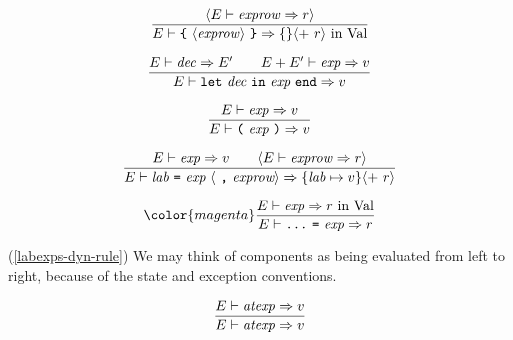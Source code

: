 \begin{equation}	%
\frac{\langle\E\ts\labexps\ra\r\rangle}
     {\E\ts\lttbrace\ \recexp\ \rttbrace\ra\emptymap
                                  \langle +\ \r\rangle\ \In\ \Val}
\end{equation}

\begin{equation}        %
\frac{\E\ts\dec\ra\E'\qquad\E+\E'\ts\exp\ra\V}
     {\E\ts\letexp\ra\V}
\end{equation}

\begin{equation}	%
\frac{\E\ts\exp\ra\V}
     {\E\ts\parexp\ra\V}
\end{equation}
\comments
\begin{description}


\end{description}

\begin{equation}	%
\label{labexps-dyn-rule}
\frac{\E\ts\exp\ra\V\qquad\langle\E\ts\labexps\ra\r\rangle}
     {\E\ts\longlabexps\ra\{\lab\mapsto\V\}\langle +\ \r\rangle}\index{52.2}
\end{equation}%

\BeginNewEqns%
\begin{equation} %
\color{\addcolor}
\frac{\E\ts\exp\ra\r\ \In\ \Val}
     {\E\ts\boxml{...}\ \boxml{=}\ \exp\ra\r}
\end{equation}%
\EndNewEqns%

\comments
\begin{description}
\item{(\ref{labexps-dyn-rule})}
  We may think of components as being evaluated from left to right,
  because of the state and exception conventions.
\end{description}%
%
%
\begin{equation}	%
\frac{\E\ts\atexp\ra\V}
     {\E\ts\atexp\ra\V}\index{52.3}
\end{equation}

